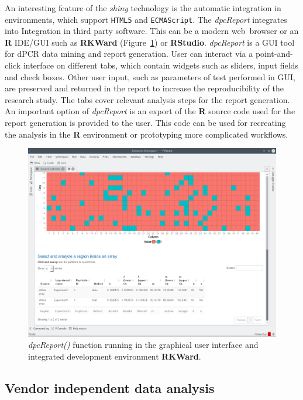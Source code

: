 \documentclass[a4,center,fleqn]{NAR}
\begin{document}
An interesting feature of the \textit{shiny} technology is the automatic 
integration in environments, which support \texttt{HTML5} and 
\texttt{ECMAScript}. The \textit{dpcReport} integrates into Integration in 
third 
party software. This can be a modern web~browser or an \textbf{R} IDE/GUI such 
as \textbf{RKWard} (Figure~\ref{GUI_RKWard_1}) \cite{rodiger_rkward_2012} or 
\textbf{RStudio}. \textit{dpcReport} is a GUI tool for dPCR data mining and 
report generation. User can interact via a point-and-click interface on 
different tabs, which contain widgets such as sliders, input fields and check 
boxes. Other user input, such as parameters of test performed in GUI, are 
preserved and returned in the report to increase the reproducibility of the 
research study. The tabs cover relevant analysis steps for the report 
generation. An important option of \textit{dpcReport} is an export of the 
\textbf{R} source code used for the report generation is provided to the user. 
This code can be used for recreating the analysis in the \textbf{R} environment 
or prototyping more complicated workflows.


\begin{figure}[t]
\begin{center}
\includegraphics[width=17cm]{GUI_RKWard_1.png}
\end{center}
\caption{\textit{dpcReport()} function running in the graphical user interface 
and integrated development environment \textbf{RKWard}.} 
\label{GUI_RKWard_1}
\end{figure}

\subsection{Vendor independent data analysis}
\end{document}

